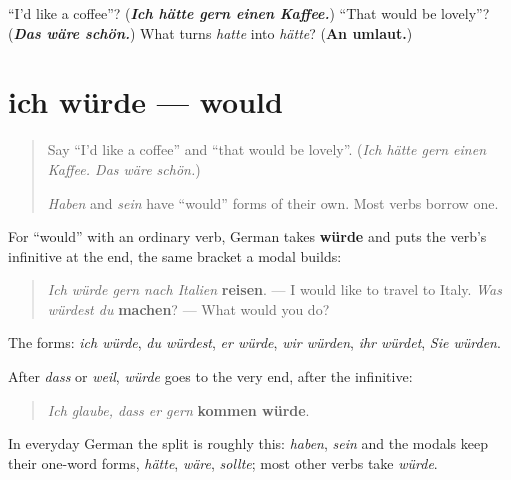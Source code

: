 \begin{tcolorbox}[breakable,colback=teal!4,colframe=teal!35!black,title={Before you move on}]
\textquotedblleft{}I'd like a coffee\textquotedblright{}? (\emph{\textbf{Ich hätte gern einen Kaffee.}}) \textquotedblleft{}That would be lovely\textquotedblright{}? (\emph{\textbf{Das wäre schön.}}) What turns \emph{hatte} into \emph{hätte}? (\textbf{An umlaut.})
\end{tcolorbox}
\section[ich würde + infinitive]{ich würde — would}

\label{lesson:GE-C261-ich-wuerde}



\begin{quote}
Say \textquotedblleft{}I'd like a coffee\textquotedblright{} and \textquotedblleft{}that would be lovely\textquotedblright{}. (\emph{Ich hätte gern einen Kaffee. Das wäre schön.})

\emph{Haben} and \emph{sein} have \textquotedblleft{}would\textquotedblright{} forms of their own. Most verbs borrow one.
\end{quote}

\begin{grammarlens}[title={Grammar Lens: würde, and the infinitive last}]
For \textquotedblleft{}would\textquotedblright{} with an ordinary verb, German takes \textbf{würde} and puts the verb's infinitive at the end, the same bracket a modal builds:

\begin{quote}
\emph{Ich würde gern nach Italien} \textbf{reisen}. — I would like to travel to Italy. \emph{Was würdest du} \textbf{machen}? — What would you do?
\end{quote}

The forms: \emph{ich würde}, \emph{du würdest}, \emph{er würde}, \emph{wir würden}, \emph{ihr würdet}, \emph{Sie würden}.

After \emph{dass} or \emph{weil}, \emph{würde} goes to the very end, after the infinitive:

\begin{quote}
\emph{Ich glaube, dass er gern} \textbf{kommen würde}.
\end{quote}

In everyday German the split is roughly this: \emph{haben}, \emph{sein} and the modals keep their one-word forms, \emph{hätte}, \emph{wäre}, \emph{sollte}; most other verbs take \emph{würde}.
\end{grammarlens}

